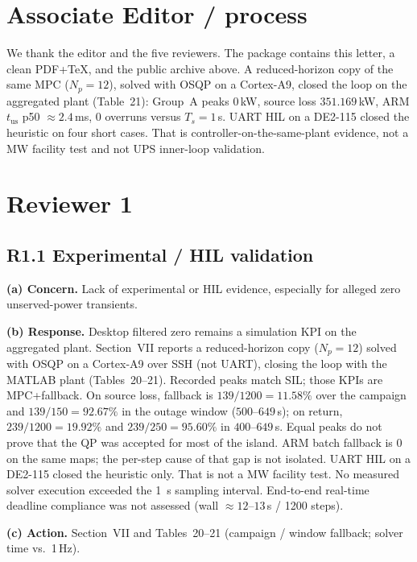 \documentclass[11pt]{article}
\begin{document}
\section*{Associate Editor / process}

We thank the editor and the five reviewers. The package contains this letter, a clean PDF+TeX, and the public archive above. A reduced-horizon copy of the same MPC ($N_p=12$), solved with OSQP on a Cortex-A9, closed the loop on the aggregated plant (Table~21): Group~A peaks $0$\,kW, source loss $351.169$\,kW, ARM $t_{\mathrm{us}}$ p50 $\approx 2.4$\,ms, 0 overruns versus $T_s=1$\,s. UART HIL on a DE2-115 closed the heuristic on four short cases. That is controller-on-the-same-plant evidence, not a MW facility test and not UPS inner-loop validation.

\section*{Reviewer 1}

\subsection*{R1.1 Experimental / HIL validation}
\textbf{(a) Concern.} Lack of experimental or HIL evidence, especially for alleged zero unserved-power transients.

\textbf{(b) Response.} Desktop filtered zero remains a simulation KPI on the aggregated plant. Section~VII reports a reduced-horizon copy ($N_p=12$) solved with OSQP on a Cortex-A9 over SSH (not UART), closing the loop with the MATLAB plant (Tables~20--21). Recorded peaks match SIL; those KPIs are MPC+fallback. On source loss, fallback is $139/1200=11.58\%$ over the campaign and $139/150=92.67\%$ in the outage window ($500$--$649$\,s); on return, $239/1200=19.92\%$ and $239/250=95.60\%$ in $400$--$649$\,s. Equal peaks do not prove that the QP was accepted for most of the island. ARM batch fallback is 0 on the same maps; the per-step cause of that gap is not isolated. UART HIL on a DE2-115 closed the heuristic only. That is not a MW facility test. No measured solver execution exceeded the \SI{1}{\second} sampling interval. End-to-end real-time deadline compliance was not assessed (wall $\approx 12$--$13$\,s / 1200 steps).

\textbf{(c) Action.} Section~VII and Tables~20--21 (campaign / window fallback; solver time vs.\ 1\,Hz).
\end{document}
